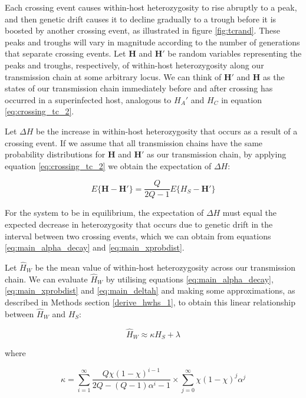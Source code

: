 \documentclass[_main.tex]{subfiles}
\begin{document}
Each crossing event causes within-host heterozygosity to rise abruptly to a peak, and then genetic drift causes it to decline gradually to a trough before it is boosted by another crossing event, as illustrated in figure \ref{fig:tcrand}.  These peaks and troughs will vary in magnitude according to the number of generations that separate crossing events.  Let $\mathbf{H}$ and  $\mathbf{H'}$ be random variables representing the peaks and troughs, respectively, of within-host heterozygosity along our transmission chain at some arbitrary locus.  We can think of $\mathbf{H'}$ and $\mathbf{H}$ as the states of our transmission chain immediately before and after crossing has occurred in a superinfected host, analogous to $H_A'$ and $H_C$ in equation \ref{eq:crossing_tc_2}.  

Let $\Delta H$ be the increase in within-host heterozygosity that occurs as a result of a crossing event.  If we assume that all transmission chains have the same probability distributions for $\mathbf{H}$ and $\mathbf{H'}$ as our transmission chain, by applying equation \ref{eq:crossing_tc_2} we obtain the expectation of $\Delta H$:

\begin{equation}
\label{eq:main_deltah}
E \{ \mathbf{H} - \mathbf{H'} \} = \frac{Q}{2Q-1} E\{ H_S  - \mathbf{H'} \}
\end{equation}

For the system to be in equilibrium, the expectation of $\Delta H$ must equal the expected decrease in heterozygosity that occurs due to genetic drift in the interval between two crossing events, which we can obtain from equations \ref{eq:main_alpha_decay} and \ref{eq:main_xprobdist}. 

Let $\widehat{H}_W$ be the mean value of within-host heterozygosity across our transmission chain. We can evaluate $\widehat{H}_W$ by utilising equations \ref{eq:main_alpha_decay}, \ref{eq:main_xprobdist} and \ref{eq:main_deltah} and making some approximations, as described in Methods section \ref{derive_hwhs_1}, to obtain this linear relationship between $\widehat{H}_W$ and $H_S$: 

\begin{equation}
\label{eq:main_hwhs}
\widehat{H}_W \approx \kappa H_S + \lambda
\end{equation}

where

\begin{equation*}
\kappa =
\sum_{i=1}^\infty \frac{Q \chi (1-\chi)^{i-1}}{ 2Q - (Q-1) \alpha^i - 1}
\times
\sum_{j=0}^\infty \chi (1 - \chi)^j \alpha^j
\end{equation*}
\end{document}
